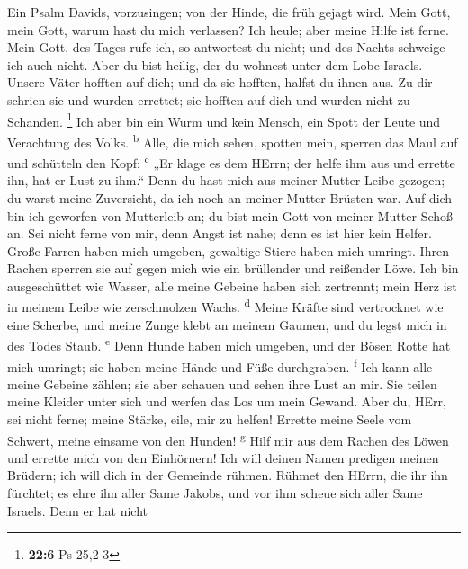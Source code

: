  Ein Psalm Davids, vorzusingen; von der Hinde, die früh
gejagt wird.  Mein Gott, mein Gott, warum hast du mich
verlassen? Ich heule; aber meine Hilfe ist ferne.  Mein
Gott, des Tages rufe ich, so antwortest du nicht; und des Nachts
schweige ich auch nicht.  Aber du bist heilig, der du
wohnest unter dem Lobe Israels.  Unsere Väter hofften auf
dich; und da sie hofften, halfst du ihnen aus.  Zu dir
schrien sie und wurden errettet; sie hofften auf dich und wurden nicht
zu Schanden. \footnote{\textbf{22:6} Ps 25,2-3}  Ich aber
bin ein Wurm und kein Mensch, ein Spott der Leute und Verachtung des
Volks. \textsuperscript{b}  Alle, die mich sehen, spotten
mein, sperren das Maul auf und schütteln den Kopf: \textsuperscript{c}
 „Er klage es dem HErrn; der helfe ihm aus und errette
ihn, hat er Lust zu ihm.``  Denn du hast mich aus meiner
Mutter Leibe gezogen; du warst meine Zuversicht, da ich noch an meiner
Mutter Brüsten war.  Auf dich bin ich geworfen von
Mutterleib an; du bist mein Gott von meiner Mutter Schoß an.
 Sei nicht ferne von mir, denn Angst ist nahe; denn es
ist hier kein Helfer.  Große Farren haben mich umgeben,
gewaltige Stiere haben mich umringt.  Ihren Rachen
sperren sie auf gegen mich wie ein brüllender und reißender Löwe.
 Ich bin ausgeschüttet wie Wasser, alle meine Gebeine
haben sich zertrennt; mein Herz ist in meinem Leibe wie zerschmolzen
Wachs. \textsuperscript{d}  Meine Kräfte sind vertrocknet
wie eine Scherbe, und meine Zunge klebt an meinem Gaumen, und du legst
mich in des Todes Staub. \textsuperscript{e}  Denn Hunde
haben mich umgeben, und der Bösen Rotte hat mich umringt; sie haben
meine Hände und Füße durchgraben. \textsuperscript{f} 
Ich kann alle meine Gebeine zählen; sie aber schauen und sehen ihre Lust
an mir.  Sie teilen meine Kleider unter sich und werfen
das Los um mein Gewand.  Aber du, HErr, sei nicht ferne;
meine Stärke, eile, mir zu helfen!  Errette meine Seele
vom Schwert, meine einsame von den Hunden! \textsuperscript{g}
 Hilf mir aus dem Rachen des Löwen und errette mich von
den Einhörnern!  Ich will deinen Namen predigen meinen
Brüdern; ich will dich in der Gemeinde rühmen.  Rühmet
den HErrn, die ihr ihn fürchtet; es ehre ihn aller Same Jakobs, und vor
ihm scheue sich aller Same Israels.  Denn er hat nicht

